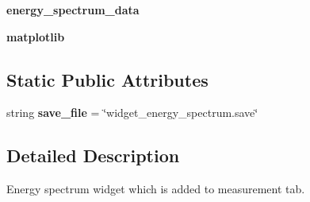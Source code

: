 \begin{DoxyCompactItemize}
\item 
\hypertarget{classDialogs_1_1EnergySpectrumDialog_1_1EnergySpectrumWidget_a0e05aa886bb66d9fd8482d4de6f21d45}{{\bfseries energy\-\_\-spectrum\-\_\-data}}\label{classDialogs_1_1EnergySpectrumDialog_1_1EnergySpectrumWidget_a0e05aa886bb66d9fd8482d4de6f21d45}

\item 
\hypertarget{classDialogs_1_1EnergySpectrumDialog_1_1EnergySpectrumWidget_ac151b3c59e72dbb5cbddb7fa596654c1}{{\bfseries matplotlib}}\label{classDialogs_1_1EnergySpectrumDialog_1_1EnergySpectrumWidget_ac151b3c59e72dbb5cbddb7fa596654c1}

\end{DoxyCompactItemize}
\subsection*{Static Public Attributes}
\begin{DoxyCompactItemize}
\item 
\hypertarget{classDialogs_1_1EnergySpectrumDialog_1_1EnergySpectrumWidget_a051f559de9ad5bbe947f7019b099e891}{string {\bfseries save\-\_\-file} = \char`\"{}widget\-\_\-energy\-\_\-spectrum.\-save\char`\"{}}\label{classDialogs_1_1EnergySpectrumDialog_1_1EnergySpectrumWidget_a051f559de9ad5bbe947f7019b099e891}

\end{DoxyCompactItemize}


\subsection{Detailed Description}
\begin{DoxyVerb}Energy spectrum widget which is added to measurement tab.
\end{DoxyVerb}
 


